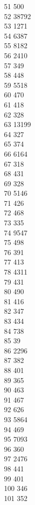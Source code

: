 { 51	500 \\
 52	38792 \\
 53	1271 \\
 54	6387 \\
 55	8182 \\
 56	2410 \\
 57	349 \\
 58	448 \\
 59	5518 \\
 60	470 \\
 61	418 \\
 62	328 \\
 63	13199 \\
 64	327 \\
 65	374 \\
 66	6164 \\
 67	318 \\
 68	431 \\
 69	328 \\
 70	5146 \\
 71	426 \\
 72	468 \\
 73	335 \\
 74	9547 \\
 75	498 \\
 76	391 \\
 77	413 \\
 78	4311 \\
 79	431 \\
 80	490 \\
 81	416 \\
 82	347 \\
 83	434 \\
 84	738 \\
 85	39 \\
 86	2296 \\
 87	382 \\
 88	401 \\
 89	365 \\
 90	463 \\
 91	467 \\
 92	626 \\
 93	5864 \\
 94	469 \\
 95	7093 \\
 96	360 \\
 97	2476 \\
 98	441 \\
 99	401 \\
 100	346 \\
 101	352 \\
}
